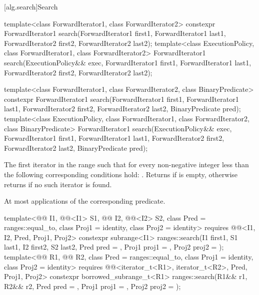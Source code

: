 [alg.search]{Search}

%
\begin{itemdecl}
template<class ForwardIterator1, class ForwardIterator2>
  constexpr ForwardIterator1
    search(ForwardIterator1 first1, ForwardIterator1 last1,
           ForwardIterator2 first2, ForwardIterator2 last2);
template<class ExecutionPolicy, class ForwardIterator1, class ForwardIterator2>
  ForwardIterator1
    search(ExecutionPolicy&& exec,
           ForwardIterator1 first1, ForwardIterator1 last1,
           ForwardIterator2 first2, ForwardIterator2 last2);

template<class ForwardIterator1, class ForwardIterator2,
         class BinaryPredicate>
  constexpr ForwardIterator1
    search(ForwardIterator1 first1, ForwardIterator1 last1,
           ForwardIterator2 first2, ForwardIterator2 last2,
           BinaryPredicate pred);
template<class ExecutionPolicy, class ForwardIterator1, class ForwardIterator2,
         class BinaryPredicate>
  ForwardIterator1
    search(ExecutionPolicy&& exec,
           ForwardIterator1 first1, ForwardIterator1 last1,
           ForwardIterator2 first2, ForwardIterator2 last2,
           BinaryPredicate pred);
\end{itemdecl}

\begin{itemdescr}
\pnum
\returns
The first iterator  in the range 
such that
for every non-negative integer  less than 
the following corresponding conditions hold:
.
Returns  if  is empty,
otherwise returns  if no such iterator is found.

\pnum
\complexity
At most  applications
of the corresponding predicate.
\end{itemdescr}

%
\begin{itemdecl}
template<@@ I1, @@<I1> S1, @@ I2,
         @@<I2> S2, class Pred = ranges::equal_to,
         class Proj1 = identity, class Proj2 = identity>
  requires @@<I1, I2, Pred, Proj1, Proj2>
  constexpr subrange<I1>
    ranges::search(I1 first1, S1 last1, I2 first2, S2 last2, Pred pred = {},
                   Proj1 proj1 = {}, Proj2 proj2 = {});
template<@@ R1, @@ R2, class Pred = ranges::equal_to,
         class Proj1 = identity, class Proj2 = identity>
  requires @@<iterator_t<R1>, iterator_t<R2>, Pred, Proj1, Proj2>
  constexpr borrowed_subrange_t<R1>
    ranges::search(R1&& r1, R2&& r2, Pred pred = {},
                   Proj1 proj1 = {}, Proj2 proj2 = {});
\end{itemdecl}

